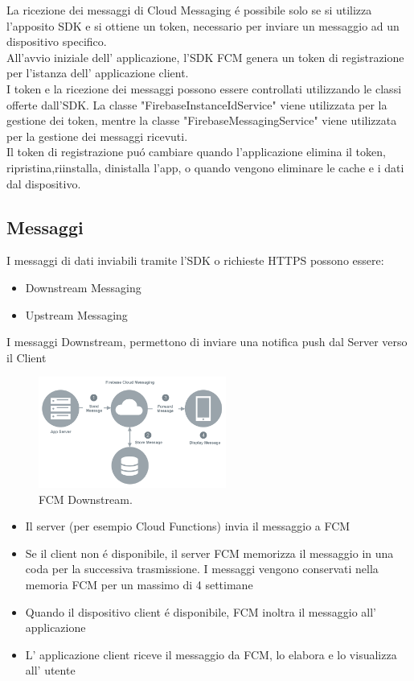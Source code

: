 \newpage
La ricezione dei messaggi di Cloud Messaging \'e possibile solo se si utilizza l'apposito SDK e si ottiene un token, necessario per inviare un messaggio ad un dispositivo specifico.\\
All'avvio iniziale dell' applicazione, l'SDK FCM genera un token di registrazione per l'istanza dell' applicazione client.\\
I token e la ricezione dei messaggi possono essere controllati utilizzando le classi offerte dall'SDK.
La classe "FirebaseInstanceIdService" viene utilizzata per la gestione dei token, mentre la classe "FirebaseMessagingService" viene utilizzata per la gestione dei messaggi ricevuti.\\
Il token di registrazione pu\'o cambiare quando l'applicazione elimina il token, ripristina,riinstalla, dinistalla l'app, o quando vengono eliminare le cache e i dati dal dispositivo.


\subsection{Messaggi}
I messaggi di dati inviabili tramite l'SDK o richieste HTTPS possono essere:
\begin{itemize}
    \item Downstream Messaging
    \item Upstream Messaging
\end{itemize}

I messaggi Downstream, permettono di inviare una notifica push dal Server verso il Client

\begin{figure}[!hb]
  \centering
  \includegraphics[width=0.55\textwidth]{immagini/fcm_down.png}
  \caption{FCM Downstream.}
  \label{fig:FCM Downstream}
\end{figure}




\begin{itemize}
    \item Il server (per esempio Cloud Functions) invia il messaggio a FCM
    \item Se il client non \'e disponibile, il server FCM memorizza il messaggio in una coda per la successiva trasmissione. I messaggi vengono conservati nella memoria FCM per un massimo di 4 settimane
    \item Quando il dispositivo client \'e disponibile, FCM inoltra il messaggio all' applicazione
    \item L' applicazione client riceve il messaggio da FCM, lo elabora e lo visualizza all' utente
\end{itemize}


